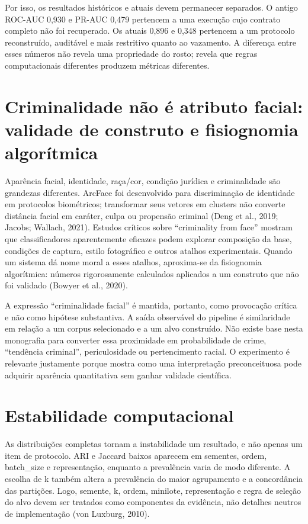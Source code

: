 Por isso, os resultados históricos e atuais devem permanecer separados. O antigo ROC-AUC 0,930 e PR-AUC 0,479 pertencem a uma execução cujo contrato completo não foi recuperado. Os atuais 0,896 e 0,348 pertencem a um protocolo reconstruído, auditável e mais restritivo quanto ao vazamento. A diferença entre esses números não revela uma propriedade do rosto; revela que regras computacionais diferentes produzem métricas diferentes.

\section{Criminalidade não é atributo facial: validade de construto e fisiognomia algorítmica}

Aparência facial, identidade, raça/cor, condição jurídica e criminalidade são grandezas diferentes. ArcFace foi desenvolvido para discriminação de identidade em protocolos biométricos; transformar seus vetores em clusters não converte distância facial em caráter, culpa ou propensão criminal (Deng et al., 2019; Jacobs; Wallach, 2021). Estudos críticos sobre ``criminality from face'' mostram que classificadores aparentemente eficazes podem explorar composição da base, condições de captura, estilo fotográfico e outros atalhos experimentais. Quando um sistema dá nome moral a esses atalhos, aproxima-se da fisiognomia algorítmica: números rigorosamente calculados aplicados a um construto que não foi validado (Bowyer et al., 2020).

A expressão ``criminalidade facial'' é mantida, portanto, como provocação crítica e não como hipótese substantiva. A saída observável do pipeline é similaridade em relação a um corpus selecionado e a um alvo construído. Não existe base nesta monografia para converter essa proximidade em probabilidade de crime, ``tendência criminal'', periculosidade ou pertencimento racial. O experimento é relevante justamente porque mostra como uma interpretação preconceituosa pode adquirir aparência quantitativa sem ganhar validade científica.

\section{Estabilidade computacional}

As distribuições completas tornam a instabilidade um resultado, e não apenas um item de protocolo. ARI e Jaccard baixos aparecem em sementes, ordem, batch\_size e representação, enquanto a prevalência varia de modo diferente. A escolha de k também altera a prevalência do maior agrupamento e a concordância das partições. Logo, semente, k, ordem, minilote, representação e regra de seleção do alvo devem ser tratados como componentes da evidência, não detalhes neutros de implementação (von Luxburg, 2010).

